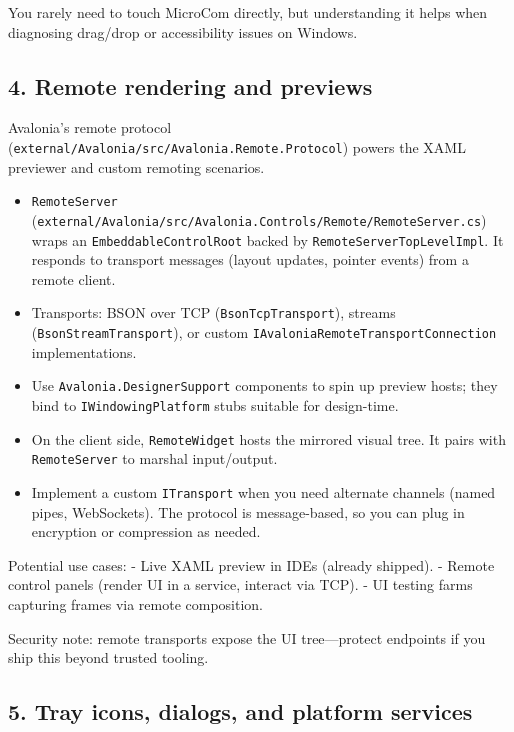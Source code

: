 You rarely need to touch MicroCom directly, but understanding it helps
when diagnosing drag/drop or accessibility issues on Windows.

\subsection{4. Remote rendering and
previews}\label{remote-rendering-and-previews}

Avalonia's remote protocol
(\passthrough{\lstinline!external/Avalonia/src/Avalonia.Remote.Protocol!})
powers the XAML previewer and custom remoting scenarios.

\begin{itemize}
\tightlist
\item
  \passthrough{\lstinline!RemoteServer!}
  (\passthrough{\lstinline!external/Avalonia/src/Avalonia.Controls/Remote/RemoteServer.cs!})
  wraps an \passthrough{\lstinline!EmbeddableControlRoot!} backed by
  \passthrough{\lstinline!RemoteServerTopLevelImpl!}. It responds to
  transport messages (layout updates, pointer events) from a remote
  client.
\item
  Transports: BSON over TCP
  (\passthrough{\lstinline!BsonTcpTransport!}), streams
  (\passthrough{\lstinline!BsonStreamTransport!}), or custom
  \passthrough{\lstinline!IAvaloniaRemoteTransportConnection!}
  implementations.
\item
  Use \passthrough{\lstinline!Avalonia.DesignerSupport!} components to
  spin up preview hosts; they bind to
  \passthrough{\lstinline!IWindowingPlatform!} stubs suitable for
  design-time.
\item
  On the client side, \passthrough{\lstinline!RemoteWidget!} hosts the
  mirrored visual tree. It pairs with
  \passthrough{\lstinline!RemoteServer!} to marshal input/output.
\item
  Implement a custom \passthrough{\lstinline!ITransport!} when you need
  alternate channels (named pipes, WebSockets). The protocol is
  message-based, so you can plug in encryption or compression as needed.
\end{itemize}

Potential use cases: - Live XAML preview in IDEs (already shipped). -
Remote control panels (render UI in a service, interact via TCP). - UI
testing farms capturing frames via remote composition.

Security note: remote transports expose the UI tree---protect endpoints
if you ship this beyond trusted tooling.

\subsection{5. Tray icons, dialogs, and platform
services}\label{tray-icons-dialogs-and-platform-services}

